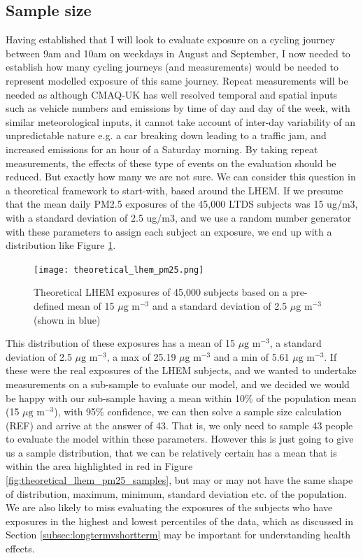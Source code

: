 \subsection{Sample size}
\label{subsec:samplesize}

Having established that I will look to evaluate exposure on a cycling journey between 9am and 10am on weekdays in August and September, I now needed to establish how many cycling journeys (and measurements) would be needed to represent modelled exposure of this same journey. Repeat measurements will be needed as although CMAQ-UK has well resolved temporal and spatial inputs such as vehicle numbers and emissions by time of day and day of the week, with similar meteorological inputs, it cannot take account of inter-day variability of an unpredictable nature e.g. a car breaking down leading to a traffic jam, and increased emissions for an hour of a Saturday morning. By taking repeat measurements, the effects of these type of events on the evaluation should be reduced. But exactly how many we are not sure. 
We can consider this question in a theoretical framework to start-with, based around the LHEM. If we presume that the mean daily PM2.5 exposures of the 45,000 LTDS subjects was 15 ug/m3, with a standard deviation of 2.5 ug/m3, and we use a random number generator with these parameters to assign each subject an exposure, we end up with a distribution like Figure \ref{fig:theoretical_lhem_pm25}.

\begin{figure}[H]
\centering
\texttt{[image: theoretical\_lhem\_pm25.png]}
\caption{Theoretical LHEM exposures of 45,000 subjects based on a pre-defined mean of 15 $\mu \text{g m}^{-3}$ and a standard deviation of 2.5 $\mu \text{g m}^{-3}$ (shown in blue)}
\label{fig:theoretical_lhem_pm25}
\end{figure}

This distribution of these exposures has a mean of 15 $\mu \text{g m}^{-3}$, a standard deviation of 2.5 $\mu \text{g m}^{-3}$, a max of 25.19 $\mu \text{g m}^{-3}$ and a min of 5.61 $\mu \text{g m}^{-3}$. If these were the real exposures of the LHEM subjects, and we wanted to undertake measurements on a sub-sample to evaluate our model, and we decided we would be happy with our sub-sample having a mean within 10\% of the population mean (15 $\mu \text{g m}^{-3}$), with 95\% confidence, we can then solve a sample size calculation (REF) and arrive at the answer of 43. That is, we only need to sample 43 people to evaluate the model within these parameters.  However this is just going to give us a sample distribution, that we can be relatively certain has a mean that is within the area highlighted in red in Figure \ref{fig:theoretical_lhem_pm25_samples}, but may or may not have the same shape of distribution, maximum, minimum, standard deviation etc. of the population. We are also likely to miss evaluating the exposures of the subjects who have exposures in the highest and lowest percentiles of the data, which as discussed in Section \ref{subsec:longtermvshortterm} may be important for understanding health effects.


